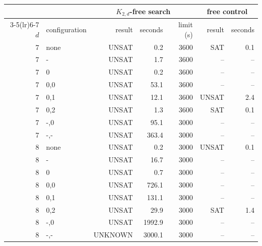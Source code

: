\begin{tabular}{rlrrrrr}
\toprule
 & & \multicolumn{3}{c}{$K_{2,d}$-free search} & \multicolumn{2}{c}{free control} \\
\cmidrule(lr){3-5}\cmidrule(lr){6-7}
$d$ & configuration & result & seconds & limit (s) & result & seconds \\
\midrule
7 & none & UNSAT & 0.2 & 3600 & SAT & 0.1 \\
7 & - & UNSAT & 1.7 & 3600 & -- & -- \\
7 & 0 & UNSAT & 0.2 & 3600 & -- & -- \\
7 & 0,0 & UNSAT & 53.1 & 3600 & -- & -- \\
7 & 0,1 & UNSAT & 12.1 & 3600 & UNSAT & 2.4 \\
7 & 0,2 & UNSAT & 1.3 & 3600 & SAT & 0.1 \\
7 & -,0 & UNSAT & 95.1 & 3000 & -- & -- \\
7 & -,- & UNSAT & 363.4 & 3000 & -- & -- \\
\midrule
8 & none & UNSAT & 0.2 & 3000 & UNSAT & 0.1 \\
8 & - & UNSAT & 16.7 & 3000 & -- & -- \\
8 & 0 & UNSAT & 0.7 & 3000 & -- & -- \\
8 & 0,0 & UNSAT & 726.1 & 3000 & -- & -- \\
8 & 0,1 & UNSAT & 131.1 & 3000 & -- & -- \\
8 & 0,2 & UNSAT & 29.9 & 3000 & SAT & 1.4 \\
8 & -,0 & UNSAT & 1992.9 & 3000 & -- & -- \\
8 & -,- & UNKNOWN & 3000.1 & 3000 & -- & -- \\
\bottomrule
\end{tabular}
